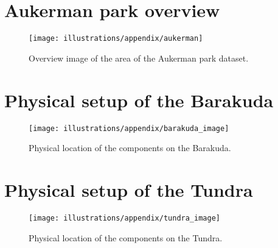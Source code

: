 \printbibliography[heading=bibnumbered, title={Bibliography}]
\cleardoublepage
\appendix


\chapter{Aukerman park overview}\label{ch:aukerman-park-overview}

\begin{figure}[!ht]
    \centering
    \texttt{[image: illustrations/appendix/aukerman]}
    \caption{Overview image of the area of the Aukerman park dataset.}
    \label{fig:appendix:aukerman_overview}
\end{figure}


\chapter{Physical setup of the Barakuda}%
\begin{figure}[!ht]%
    \centering%
    \texttt{[image: illustrations/appendix/barakuda\_image]}%
    \caption{Physical location of the components on the Barakuda.}%
    \label{fig:appendix:barakuda_image}%
\end{figure}%


\chapter{Physical setup of the Tundra}%
\begin{figure}[!ht]%
    \centering%
    \texttt{[image: illustrations/appendix/tundra\_image]}%
    \caption{Physical location of the components on the Tundra.}%
    \label{fig:appendix:tundra_image}%
\end{figure}%


